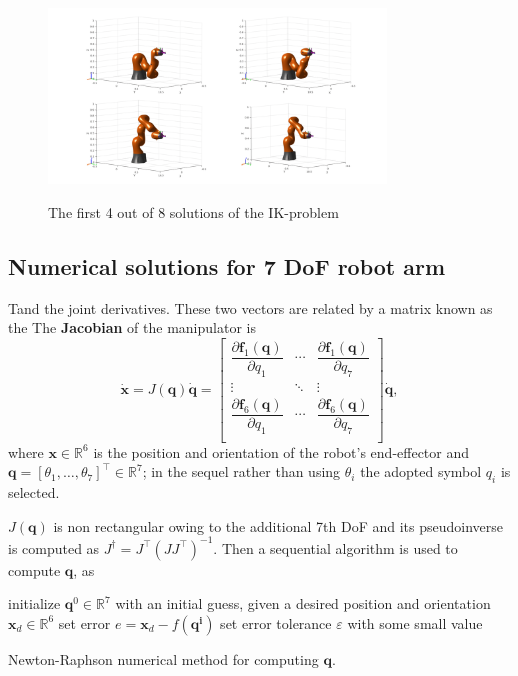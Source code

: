 \begin{center}
\begin{figure}[!htb]
\centering
\includegraphics[width=0.8\textwidth]{images/ik-4-solutions.png}\\
\caption{The first 4 out of 8 solutions of the IK-problem}
\end{figure}
\end{center}

\subsection{Numerical solutions for 7 DoF robot arm}

Tand the joint derivatives. These two vectors are related by a matrix known as the 
The \textbf{Jacobian} of the manipulator is 
\begin{equation}
\mathbf{\dot{x}} = J( \mathbf{q} ) \mathbf{\dot{q}} =
\begin{bmatrix}
\dfrac{\partial \mathbf{f}_1(\mathbf{q})}{\partial q_{1}} & \cdots & \dfrac{\partial \mathbf{f}_1(\mathbf{q})}{\partial q_{7}} \\
\vdots & \ddots & \vdots \\
\dfrac{\partial \mathbf{f}_6(\mathbf{q})}{\partial q_{1}} & \cdots & \dfrac{\partial \mathbf{f}_6(\mathbf{q})}{\partial q_{7}} \\
\end{bmatrix} 
\mathbf{\dot{q}},
\end{equation}
where $\mathbf{x} \in \mathbb{R}^6$ is the position and orientation of the robot's end-effector and $\mathbf{q} =\left[ \theta_1,\ldots,\theta_7\right]^{\top} \in \mathbb{R}^7$; in the sequel rather than using $\theta_i$ the adopted symbol $q_i$ is selected.

$J( \mathbf{q} )$ is non rectangular owing to the additional 7th DoF and its pseudoinverse is computed as $J^{\dagger} = J^\top ( J J^\top )^{-1}$. Then a sequential algorithm is used to compute $\mathbf{q}$, as
\begin{algorithm}[H]
\SetAlgoLined
initialize $\mathbf{q}^0 \in \mathbb{R}^{7}$ with an initial guess, given a desired position and orientation $\mathbf{x}_d \in \mathbb{R}^{6}$\;
set error $e = \mathbf{x}_d - f(\mathbf{q^i})$\;
set error tolerance $ε$ with some small value\;
\caption{Newton-Raphson numerical method for computing $\mathbf{q}$.}
\end{algorithm}

